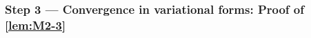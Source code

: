 \begin{comment}
        \item $\cM$ is lower hemicontinuous (l.h.c.).
        
        By definition, consider any open set $U$ such that $U \cap \cM(c) \neq \varnothing$. Since $\cM(c)$ is compact, let $u_0 \in U \cap \cM(c)$ be an interior point. Then for any $c' > 0$ such that $\norm{u_0 - w}_{\Q_n} =: c_0 < c' < c$, we have $u_0 \in \cM(c')$. This implies $U \cap \cM(c) \neq \varnothing$ for any $c' \in (c_0, \infty)$, since $\cM(c_1) \subseteq \cM(c_2)$ for any $c_1 \le c_2$. Therefore, $U$ intersects with some neighborhood of $\cM(c)$, i.e., $\cM$ is l.h.c..
    \end{itemize}
    Hence, $\cM$ is a continuous correspondence. By Maximum Theorem, $c \mapsto \zeta(c)$ is continuous.
\end{proof}
\end{comment}



\subsubsection{Step 3 --- Convergence in variational forms: Proof of \cref{lem:M2-3}}
\label{subsubsec:under_step3}

